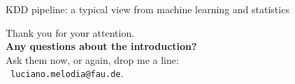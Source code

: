 \documentclass[aspectratio=169,t]{beamer}
\begin{document}
{\begin{frame}{KDD pipeline: a typical view from machine learning and statistics}
    \end{frame}
  }




  { %
    \begin{frame}[c]
      \begin{center}
        Thank you for your attention.\\
        {\bf Any questions about the introduction?}\\[0.5cm]
        Ask them now, or again, drop me a line: \\ 
        \faSendO \ \texttt{luciano.melodia@fau.de}.
      \end{center}
    \end{frame}
  }
\end{document}
